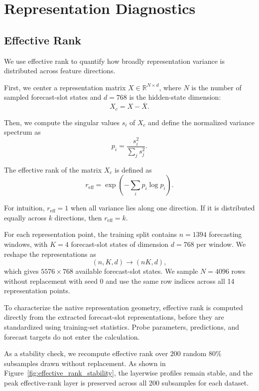 \documentclass{article}
\begin{document}
\section{Representation Diagnostics}

\subsection{Effective Rank} \label{apndx:effective-rank}

We use effective rank \citep{7098875} to quantify how broadly representation variance is distributed across feature directions.

First, we center a representation matrix \(X\in\mathbb{R}^{N\times d}\), where \(N\) is the number of sampled forecast-slot states and \(d=768\) is the hidden-state dimension:
\[
X_c = X-\bar{X}.
\]

Then, we compute the singular values \(s_i\) of \(X_c\) and define the normalized variance spectrum as
\[
p_i=\frac{s_i^2}{\sum_j s_j^2}.
\]

The effective rank of the matrix \(X_c\) is defined as
\[
r_{\mathrm{eff}}
=
\exp\left(-\sum_i p_i\log p_i\right).
\]

For intuition, \(r_{\mathrm{eff}}=1\) when all variance lies along one direction. If it is distributed equally across \(k\) directions, then \(r_{\mathrm{eff}}=k\).

For each representation point, the training split contains \(n=1394\) forecasting windows, with \(K=4\) forecast-slot states of dimension \(d=768\) per window. We reshape the representations as
\[
(n,K,d)\rightarrow(nK,d),
\]
which gives \(5576\times768\) available forecast-slot states. We sample \(N=4096\) rows without replacement with seed 0 and use the same row indices across all 14 representation points. 

To characterize the native representation geometry, effective rank is computed directly from the extracted forecast-slot representations, before they are standardized using training-set statistics. Probe parameters, predictions, and forecast targets do not enter the calculation.

As a stability check, we recompute effective rank over $200$ random \(80\%\) subsamples drawn without replacement. As shown in Figure~\ref{fig:effective_rank_stability}, the layerwise profiles remain stable, and the peak effective-rank layer is preserved across all 200 subsamples for each dataset.
\end{document}
